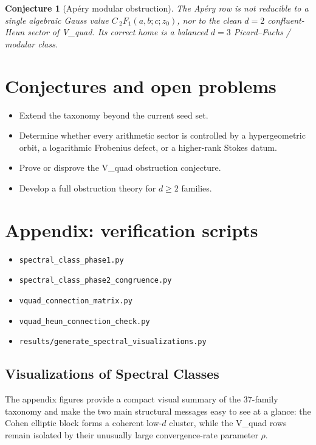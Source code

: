 \documentclass[11pt]{article}
\newtheorem{conjecture}[theorem]{Conjecture}
\begin{document}
\begin{conjecture}[Ap\'ery modular obstruction]\label{conj:apery-obstruction}
The Ap\'ery row is not reducible to a single algebraic Gauss value $C\,{}_2F_1(a,b;c;z_0)$, nor to the clean $d=2$ confluent-Heun sector of V\_quad. Its correct home is a balanced $d=3$ Picard--Fuchs / modular class.
\end{conjecture}

\section{Conjectures and open problems}
\begin{itemize}
  \item Extend the taxonomy beyond the current seed set.
  \item Determine whether every arithmetic sector is controlled by a hypergeometric orbit, a logarithmic Frobenius defect, or a higher-rank Stokes datum.
  \item Prove or disprove the V\_quad obstruction conjecture.
  \item Develop a full obstruction theory for $d \ge 2$ families.
\end{itemize}

\section{Appendix: verification scripts}\label{app:verification}
\begin{itemize}
  \item \texttt{spectral\_class\_phase1.py}
  \item \texttt{spectral\_class\_phase2\_congruence.py}
  \item \texttt{vquad\_connection\_matrix.py}
  \item \texttt{vquad\_heun\_connection\_check.py}
  \item \texttt{results/generate\_spectral\_visualizations.py}
\end{itemize}

\subsection{Visualizations of Spectral Classes}\label{app:visuals}
The appendix figures provide a compact visual summary of the 37-family taxonomy and make the two main structural messages easy to see at a glance: the Cohen elliptic block forms a coherent low-$d$ cluster, while the V\_quad rows remain isolated by their unusually large convergence-rate parameter $\rho$.
\end{document}
